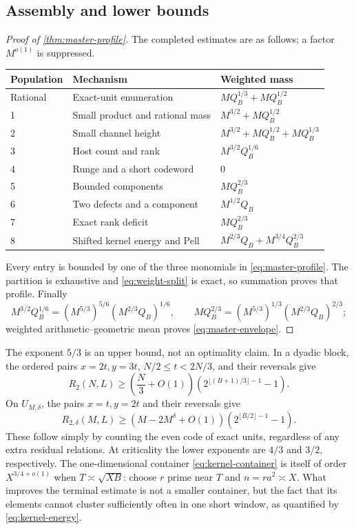 \subsection{Assembly and lower bounds}\label{sec:profile-assembly}
\begin{proof}[Proof of \cref{thm:master-profile}]
The completed estimates are as follows; a factor $M^{o(1)}$ is suppressed.
\begin{center}\small
\begin{tabularx}{\textwidth}{@{}lXl@{}}\toprule
Population & Mechanism & Weighted mass\\\midrule
Rational & Exact-unit enumeration & $MQ_B^{1/3}+MQ_B^{1/2}$\\
1 & Small product and rational mass & $M^{3/2}+MQ_B^{1/2}$\\
2 & Small channel height & $M^{3/2}+MQ_B^{1/2}+MQ_B^{1/3}$\\
3 & Host count and rank & $M^{3/2}Q_B^{1/6}$\\
4 & Runge and a short codeword & $0$\\
5 & Bounded components & $MQ_B^{2/3}$\\
6 & Two defects and a component & $M^{1/2}Q_B$\\
7 & Exact rank deficit & $MQ_B^{2/3}$\\
8 & Shifted kernel energy and Pell & $M^{2/3}Q_B+M^{3/4}Q_B^{2/3}$\\\bottomrule
\end{tabularx}
\end{center}
Every entry is bounded by one of the three monomials in
\eqref{eq:master-profile}. The partition is exhaustive and
\eqref{eq:weight-split} is exact, so summation proves that profile.
Finally
\[
 M^{3/2}Q_B^{1/6}=(M^{5/3})^{5/6}(M^{2/3}Q_B)^{1/6},\qquad
 MQ_B^{2/3}=(M^{5/3})^{1/3}(M^{2/3}Q_B)^{2/3};
\]
weighted arithmetic--geometric mean proves \eqref{eq:master-envelope}.
\end{proof}

The exponent $5/3$ is an upper bound, not an optimality claim. In a dyadic
block, the ordered pairs $x=2t,y=3t$, $N/2\le t<2N/3$, and their reversals
give
\begin{equation}\label{eq:rational-lower-dyadic}
 R_2(N,L)\ge\left(\frac N3+O(1)\right)
       \left(2^{\lfloor(B+1)/3\rfloor-1}-1\right).
\end{equation}
On $U_{M,\delta}$, the pairs $x=t,y=2t$ and their reversals give
\begin{equation}\label{eq:rational-lower-macro}
 R_{2,\delta}(M,L)\ge(M-2M^\delta+O(1))
       \left(2^{\lfloor B/2\rfloor-1}-1\right).
\end{equation}
These follow simply by counting the even code of exact units, regardless
of any extra residual relations. At criticality the lower exponents are
$4/3$ and $3/2$, respectively. The one-dimensional container
\eqref{eq:kernel-container} is itself of order $X^{3/4+o(1)}$ when
$T\asymp\sqrt{XB}$: choose $r$ prime near $T$ and $n=ra^2\asymp X$.
What improves the terminal estimate is not a smaller container, but the
fact that its elements cannot cluster sufficiently often in one short
window, as quantified by \eqref{eq:kernel-energy}.


